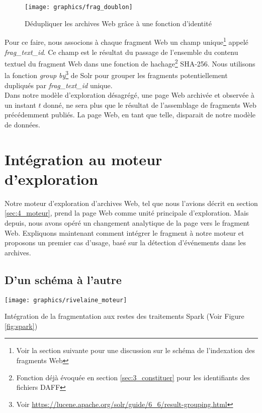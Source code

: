 \documentclass[symmetric,justified,marginals=raggedouter]{tufte-book}
\begin{document}
\begin{figure*}%
  \texttt{[image: graphics/frag\_doublon]}
  \caption{Dédupliquer les archives Web grâce à une fonction d'identité}
  \label{fig:frag_doublon}
\end{figure*}

\noindent Pour ce faire, nous associons à chaque fragment Web un champ unique\footnote{Voir la section suivante pour une discussion sur le schéma de l'indexation des fragments Web} appelé \textit{frag\_text\_id}. Ce champ est le résultat du passage de l'ensemble du contenu textuel du fragment Web dans une fonction de hachage\footnote{Fonction déjà évoquée en section \ref{sec:3_constituer} pour les identifiants des fichiers DAFF} SHA-256. Nous utilisons la fonction \textit{group by}\footnote{Voir \url{https://lucene.apache.org/solr/guide/6_6/result-grouping.html}} de Solr pour grouper les fragments potentiellement dupliqués par \textit{frag\_text\_id} unique. \\

\noindent Dans notre modèle d'exploration désagrégé, une page Web archivée et observée à un instant $t$ donné, ne sera plus que le résultat de l'assem\-blage de fragments Web précédemment publiés. La page Web, en tant que telle, disparait de notre modèle de données. 

\section{Intégration au moteur d'exploration}
\label{sec:retour_au_moteur}

\noindent Notre moteur d'exploration d'archives Web, tel que nous l'avions décrit en section \ref{sec:4_moteur}, prend la page Web comme unité principale d'exploration. Mais depuis, nous avons opéré un changement analytique de la page vers le fragment Web. Expliquons maintenant comment intégrer le fragment à notre moteur et proposons un premier cas d'usage, basé sur la détection d'événements dans les archives.

\subsection{D'un schéma à l'autre}

\begin{marginfigure}%
  \texttt{[image: graphics/rivelaine\_moteur]}
  \vspace*{0.2cm}  
  \caption{Intégration de la fragmentation aux restes des traitements Spark (Voir Figure \ref{fig:spark})}
  \label{fig:rivelaine_moteur}
\end{marginfigure}
\end{document}
